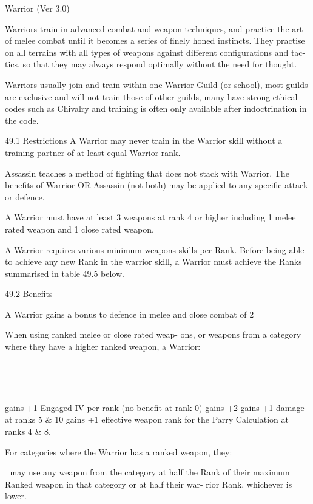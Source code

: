 \begin{Chapter}{Warrior (Ver 3.0)}

Warriors  train  in  advanced  combat  and  weapon 
techniques,  and  practice  the  art  of  melee  combat 
until  it  becomes  a  series  of  finely  honed  instincts. 
They  practise  on  all  terrains  with  all  types  of 
weapons  against  different  configurations  and  tac-
tics,  so  that  they  may  always  respond  optimally 
without the need for thought. 

Warriors usually join and train within one Warrior 
Guild  (or  school),  most  guilds  are  exclusive  and 
will  not  train  those  of  other  guilds,  many  have 
strong  ethical  codes  such  as  Chivalry  and  training 
is  often  only  available  after  indoctrination  in  the 
code. 

49.1 Restrictions 
A  Warrior  may  never  train  in  the  Warrior  skill 
without a training partner of at least equal Warrior 
rank. 

Assassin teaches a method of fighting that does not 
stack  with  Warrior.  The  benefits  of  Warrior  OR 
Assassin (not both) may be applied to any specific 
attack or defence. 

A  Warrior  must have  at  least 3  weapons  at  rank 4 
or  higher  including  1  melee  rated  weapon  and  1 
close rated weapon. 

A  Warrior  requires  various  minimum  weapons 
skills  per  Rank.  Before  being  able  to  achieve  any 
new  Rank  in  the  warrior  skill,  a  Warrior  must 
achieve the Ranks summarised in table 49.5 below. 

49.2 Benefits 

A  Warrior  gains  a  bonus  to  defence  in  melee 
and close combat of 2%

When  using  ranked  melee  or  close  rated  weap-
ons,  or  weapons  from  a  category  where  they 
have a higher ranked weapon, a Warrior: 

 

 
 
 

gains  +1  Engaged  IV  per  rank  (no  benefit  at 
rank 0) 
gains +2%
gains +1 damage at ranks 5 \& 10 
gains +1 effective weapon rank for the Parry 
Calculation at ranks 4 \& 8. 

For categories where the Warrior has a ranked 
weapon, they: 

  may  use  any  weapon  from  the  category  at 
half  the  Rank  of  their  maximum  Ranked 
weapon  in  that  category  or  at  half  their  war-
rior Rank, whichever is lower. 


\end{Chapter}
